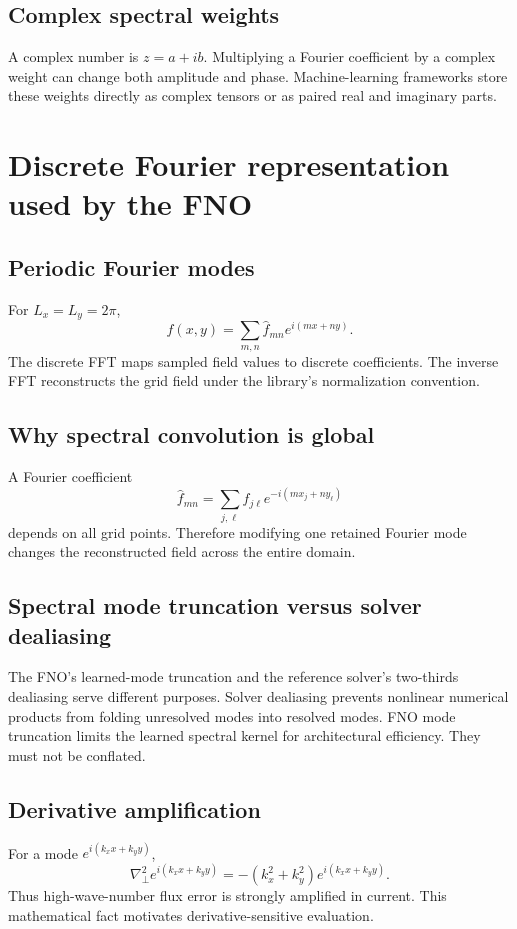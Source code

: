 \documentclass[11pt]{article}
\newcommand{\Lap}{\nabla_\perp^2}
\begin{document}
\subsection{Complex spectral weights}
A complex number is $z=a+ib$. Multiplying a Fourier coefficient by a complex weight can change both amplitude and phase. Machine-learning frameworks store these weights directly as complex tensors or as paired real and imaginary parts.

\section{Discrete Fourier representation used by the FNO}
\label{app:fourier}

\subsection{Periodic Fourier modes}
For $L_x=L_y=2\pi$,
\[
f(x,y)=\sum_{m,n}\widehat f_{mn}e^{i(mx+ny)}.
\]
The discrete FFT maps sampled field values to discrete coefficients. The inverse FFT reconstructs the grid field under the library's normalization convention.

\subsection{Why spectral convolution is global}
A Fourier coefficient
\[
\widehat f_{mn}=\sum_{j,\ell}f_{j\ell}e^{-i(mx_j+ny_\ell)}
\]
depends on all grid points. Therefore modifying one retained Fourier mode changes the reconstructed field across the entire domain.

\subsection{Spectral mode truncation versus solver dealiasing}
The FNO's learned-mode truncation and the reference solver's two-thirds dealiasing serve different purposes. Solver dealiasing prevents nonlinear numerical products from folding unresolved modes into resolved modes. FNO mode truncation limits the learned spectral kernel for architectural efficiency. They must not be conflated.

\subsection{Derivative amplification}
For a mode $e^{i(k_xx+k_yy)}$,
\[
\Lap e^{i(k_xx+k_yy)}=-(k_x^2+k_y^2)e^{i(k_xx+k_yy)}.
\]
Thus high-wave-number flux error is strongly amplified in current. This mathematical fact motivates derivative-sensitive evaluation.
\end{document}
